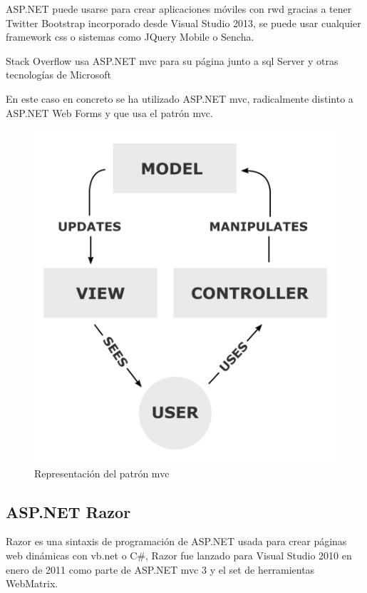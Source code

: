 ASP.NET puede usarse para crear aplicaciones móviles con \acrshort{rwd} gracias a tener Twitter Bootstrap incorporado desde Visual Studio 2013, se puede usar cualquier framework \acrshort{css} o sistemas como JQuery Mobile o Sencha.

Stack Overflow\cite{StackOverflow} usa ASP.NET \acrshort{mvc} para su página junto a \acrshort{sql} Server y otras tecnologías de Microsoft

En este caso en concreto se ha utilizado ASP.NET \acrshort{mvc}, radicalmente distinto a ASP.NET Web Forms y que usa el patrón \acrfull{mvc}.

\begin{figure}[!htbp]
	\centering
	\includegraphics[scale=0.50]{fig/mvc_pattern}
	\caption{Representación del patrón \acrshort{mvc}}
\end{figure}

\FloatBarrier

\subsection{ASP.NET Razor}

Razor es una sintaxis de programación de ASP.NET usada para crear páginas web dinámicas con \acrshort{vb.net} o C\#, Razor fue lanzado para Visual Studio 2010 en enero de 2011 como parte de ASP.NET \acrshort{mvc} 3 y el set de herramientas WebMatrix.

